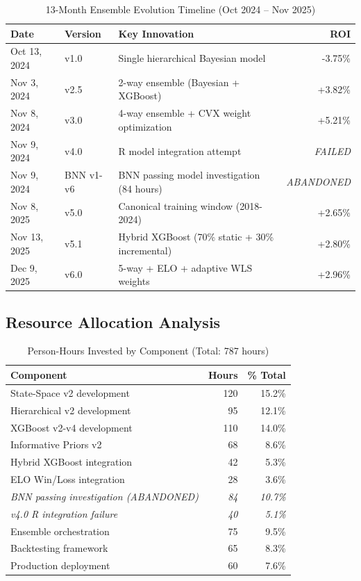 \begin{table}[h]
\centering
\caption{13-Month Ensemble Evolution Timeline (Oct 2024 -- Nov 2025)}
\label{tab:complete-timeline}
\begin{tabular}{llp{6cm}r}
\toprule
\textbf{Date} & \textbf{Version} & \textbf{Key Innovation} & \textbf{ROI} \\
\midrule
Oct 13, 2024  & v1.0   & Single hierarchical Bayesian model & -3.75\% \\
Nov 3, 2024   & v2.5   & 2-way ensemble (Bayesian + XGBoost) & +3.82\% \\
Nov 8, 2024   & v3.0   & 4-way ensemble + CVX weight optimization & +5.21\% \\
Nov 9, 2024   & v4.0   & R model integration attempt & \textit{FAILED} \\
Nov 9, 2024   & BNN v1-v6 & BNN passing model investigation (84 hours) & \textit{ABANDONED} \\
Nov 8, 2025   & v5.0   & Canonical training window (2018-2024) & +2.65\% \\
Nov 13, 2025  & v5.1   & Hybrid XGBoost (70\% static + 30\% incremental) & +2.80\% \\
Dec 9, 2025   & v6.0   & 5-way + ELO + adaptive WLS weights & +2.96\% \\
\bottomrule
\end{tabular}
\end{table}

\subsection{Resource Allocation Analysis}

\begin{table}[h]
\centering
\caption{Person-Hours Invested by Component (Total: 787 hours)}
\begin{tabular}{lrr}
\toprule
\textbf{Component} & \textbf{Hours} & \textbf{\% Total} \\
\midrule
State-Space v2 development & 120 & 15.2\% \\
Hierarchical v2 development & 95 & 12.1\% \\
XGBoost v2-v4 development & 110 & 14.0\% \\
Informative Priors v2 & 68 & 8.6\% \\
Hybrid XGBoost integration & 42 & 5.3\% \\
ELO Win/Loss integration & 28 & 3.6\% \\
\midrule
\textit{BNN passing investigation (ABANDONED)} & \textit{84} & \textit{10.7\%} \\
\textit{v4.0 R integration failure} & \textit{40} & \textit{5.1\%} \\
\midrule
Ensemble orchestration & 75 & 9.5\% \\
Backtesting framework & 65 & 8.3\% \\
Production deployment & 60 & 7.6\% \\
\bottomrule
\end{tabular}
\end{table}

